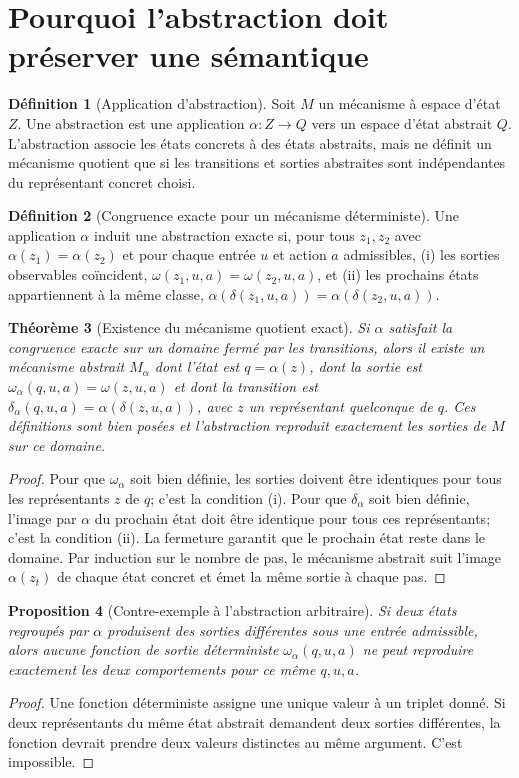 \documentclass[11pt,oneside]{book}
\newtheorem{theoreme}{Théorème}[chapter]
\newtheorem{proposition}[theoreme]{Proposition}
\theoremstyle{definition}
\newtheorem{definition}[theoreme]{Définition}
\theoremstyle{remark}
\newcommand{\1}{\mathbf 1}
\begin{document}
\section{Pourquoi l'abstraction doit préserver une sémantique}
\begin{definition}[Application d'abstraction]
Soit $M$ un mécanisme à espace d'état $Z$. Une abstraction est une application $\alpha:Z\to Q$ vers un espace d'état abstrait $Q$. L'abstraction associe les états concrets à des états abstraits, mais ne définit un mécanisme quotient que si les transitions et sorties abstraites sont indépendantes du représentant concret choisi.
\end{definition}

\begin{definition}[Congruence exacte pour un mécanisme déterministe]
Une application $\alpha$ induit une abstraction exacte si, pour tous $z_1,z_2$ avec $\alpha(z_1)=\alpha(z_2)$ et pour chaque entrée $u$ et action $a$ admissibles, (i) les sorties observables coïncident, $\omega(z_1,u,a)=\omega(z_2,u,a)$, et (ii) les prochains états appartiennent à la même classe, $\alpha(\delta(z_1,u,a))=\alpha(\delta(z_2,u,a))$.\end{definition}

\begin{theoreme}[Existence du mécanisme quotient exact]
Si $\alpha$ satisfait la congruence exacte sur un domaine fermé par les transitions, alors il existe un mécanisme abstrait $M_\alpha$ dont l'état est $q=\alpha(z)$, dont la sortie est $\omega_\alpha(q,u,a)=\omega(z,u,a)$ et dont la transition est $\delta_\alpha(q,u,a)=\alpha(\delta(z,u,a))$, avec $z$ un représentant quelconque de $q$. Ces définitions sont bien posées et l'abstraction reproduit exactement les sorties de $M$ sur ce domaine.
\end{theoreme}
\begin{proof}
Pour que $\omega_\alpha$ soit bien définie, les sorties doivent être identiques pour tous les représentants $z$ de $q$; c'est la condition (i). Pour que $\delta_\alpha$ soit bien définie, l'image par $\alpha$ du prochain état doit être identique pour tous ces représentants; c'est la condition (ii). La fermeture garantit que le prochain état reste dans le domaine. Par induction sur le nombre de pas, le mécanisme abstrait suit l'image $\alpha(z_t)$ de chaque état concret et émet la même sortie à chaque pas.\end{proof}

\begin{proposition}[Contre-exemple à l'abstraction arbitraire]
Si deux états regroupés par $\alpha$ produisent des sorties différentes sous une entrée admissible, alors aucune fonction de sortie déterministe $\omega_\alpha(q,u,a)$ ne peut reproduire exactement les deux comportements pour ce même $q,u,a$.
\end{proposition}
\begin{proof}
Une fonction déterministe assigne une unique valeur à un triplet donné. Si deux représentants du même état abstrait demandent deux sorties différentes, la fonction devrait prendre deux valeurs distinctes au même argument. C'est impossible.\end{proof}
\end{document}
